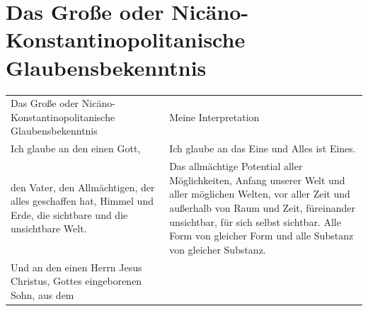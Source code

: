 \documentclass[
  ngerman,
]{article}
\begin{document}
\section{\texorpdfstring{\hfill\break
}{ }}\label{section-1}

\section{\texorpdfstring{\textbf{Das Große oder
Nicäno-Konstantinopolitanische
Glaubensbekenntnis}}{Das Große oder Nicäno-Konstantinopolitanische Glaubensbekenntnis}}\label{das-grouxdfe-oder-nicuxe4no-konstantinopolitanische-glaubensbekenntnis}

\begin{longtable}[]{@{}
  >{\raggedright\arraybackslash}p{}
  >{\raggedright\arraybackslash}p{}@{}}
\toprule\noalign{}
\begin{minipage}[b]{\linewidth}\raggedright
Das Große oder Nicäno-Konstantinopolitanische Glaubensbekenntnis
\end{minipage} & \begin{minipage}[b]{\linewidth}\raggedright
Meine Interpretation
\end{minipage} \\
\begin{minipage}[b]{\linewidth}\raggedright
Ich glaube an den einen Gott,
\end{minipage} & \begin{minipage}[b]{\linewidth}\raggedright
Ich glaube an das Eine und Alles ist Eines.
\end{minipage} \\
\begin{minipage}[b]{\linewidth}\raggedright
den Vater, den Allmächtigen, der alles geschaffen hat, Himmel und Erde,
die sichtbare und die unsichtbare Welt.
\end{minipage} & \begin{minipage}[b]{\linewidth}\raggedright
Das allmächtige Potential aller Möglichkeiten, Anfang unserer Welt und
aller möglichen Welten, vor aller Zeit und außerhalb von Raum und Zeit,
füreinander unsichtbar, für sich selbst sichtbar. Alle Form von gleicher
Form und alle Substanz von gleicher Substanz.
\end{minipage} \\
\begin{minipage}[b]{\linewidth}\raggedright
Und an den einen Herrn Jesus Christus, Gottes eingeborenen Sohn, aus dem

\end{minipage}
\end{longtable}
\end{document}
